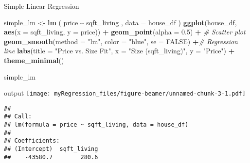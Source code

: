 \documentclass[
  ignorenonframetext,
]{beamer}
\newenvironment{Shaded}{\begin{snugshade}}{\end{snugshade}}
\newcommand{\AttributeTok}[1]{\textcolor[rgb]{0.13,0.29,0.53}{#1}}
\newcommand{\CommentTok}[1]{\textcolor[rgb]{0.56,0.35,0.01}{\textit{#1}}}
\newcommand{\ConstantTok}[1]{\textcolor[rgb]{0.56,0.35,0.01}{#1}}
\newcommand{\FloatTok}[1]{\textcolor[rgb]{0.00,0.00,0.81}{#1}}
\newcommand{\FunctionTok}[1]{\textcolor[rgb]{0.13,0.29,0.53}{\textbf{#1}}}
\newcommand{\NormalTok}[1]{#1}
\newcommand{\OtherTok}[1]{\textcolor[rgb]{0.56,0.35,0.01}{#1}}
\newcommand{\SpecialCharTok}[1]{\textcolor[rgb]{0.81,0.36,0.00}{\textbf{#1}}}
\newcommand{\StringTok}[1]{\textcolor[rgb]{0.31,0.60,0.02}{#1}}
\begin{document}
\begin{frame}[fragile]{Simple Linear Regression}
\label{simple-linear-regression}
\begin{block}{}
\label{section-2}
\begin{Shaded}
\begin{Highlighting}[]
\NormalTok{simple\_lm }\OtherTok{\textless{}{-}} \FunctionTok{lm}\NormalTok{ ( price }\SpecialCharTok{\textasciitilde{}}\NormalTok{ sqft\_living ,}
                  \AttributeTok{data =}\NormalTok{ house\_df )}
\FunctionTok{ggplot}\NormalTok{(house\_df, }\FunctionTok{aes}\NormalTok{(}\AttributeTok{x =}\NormalTok{ sqft\_living, }\AttributeTok{y =}\NormalTok{ price)) }\SpecialCharTok{+}
  \FunctionTok{geom\_point}\NormalTok{(}\AttributeTok{alpha =} \FloatTok{0.5}\NormalTok{) }\SpecialCharTok{+}  \CommentTok{\# Scatter plot}
  \FunctionTok{geom\_smooth}\NormalTok{(}\AttributeTok{method =} \StringTok{"lm"}\NormalTok{, }\AttributeTok{color =} \StringTok{"blue"}\NormalTok{, }\AttributeTok{se =} \ConstantTok{FALSE}\NormalTok{) }\SpecialCharTok{+}\CommentTok{\# Regression line}
  \FunctionTok{labs}\NormalTok{(}\AttributeTok{title =} \StringTok{"Price vs. Size Fit"}\NormalTok{,}
       \AttributeTok{x =} \StringTok{"Size (sqft\_living)"}\NormalTok{,}
       \AttributeTok{y =} \StringTok{"Price"}\NormalTok{) }\SpecialCharTok{+}
  \FunctionTok{theme\_minimal}\NormalTok{()}
  
\NormalTok{simple\_lm}
\end{Highlighting}
\end{Shaded}
\end{block}
\end{frame}

\begin{frame}[fragile]{}
\label{section-3}
\begin{block}{output}
\label{output}
\texttt{[image: myRegression\_files/figure-beamer/unnamed-chunk-3-1.pdf]}

\begin{verbatim}
## 
## Call:
## lm(formula = price ~ sqft_living, data = house_df)
## 
## Coefficients:
## (Intercept)  sqft_living  
##    -43580.7        280.6
\end{verbatim}
\end{block}
\end{frame}
\end{document}
